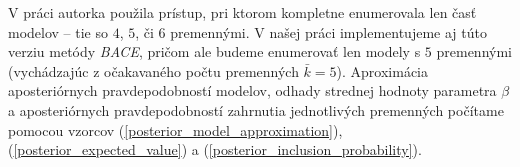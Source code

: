V práci \cite{ondrusekova} autorka použila prístup, pri ktorom kompletne enumerovala len časť modelov – tie so \(4\), \(5\), či \(6\) premennými.
V našej práci implementujeme aj túto verziu metódy \emph{BACE}, pričom ale budeme enumerovať len modely s \(5\) premennými (vychádzajúc z očakavaného počtu premenných \(\bar{k} = 5\)).
Aproximácia aposteriórnych pravdepodobností modelov, odhady strednej hodnoty parametra \(\beta\) a aposteriórnych pravdepodobností zahrnutia jednotlivých premenných počítame pomocou vzorcov
(\ref{posterior_model_approximation}), (\ref{posterior_expected_value}) a (\ref{posterior_inclusion_probability}).